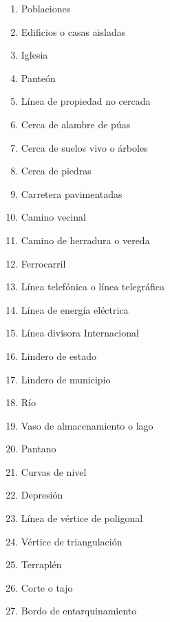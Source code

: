 \begin{multicols*}{2}
	\begin{enumerate}
		\item Poblaciones
		\item Edificios o casas aisladas
		\item Iglesia
		\item Panteón
		\item Línea de propiedad no cercada
		\item Cerca de alambre de púas
		\item Cerca de suelos vivo o árboles
		\item Cerca de piedras
		\item Carretera pavimentadas
		\item Camino vecinal
		\item Camino de herradura o vereda
		\item Ferrocarril
		\item Línea telefónica o línea telegráfica
		\item Línea de energía eléctrica
		\item Línea divisora Internacional
		\item Lindero de estado
		\item Lindero de municipio
		\item Río
		\item Vaso de almacenamiento o lago
		\item Pantano
		\item Curvas de nivel
		\item Depresión
		\item Línea de vértice de poligonal
		\item Vértice de triangulación
		\item Terraplén
		\item Corte o tajo
		\item Bordo de entarquinamiento
	\end{enumerate}
\end{multicols*}

